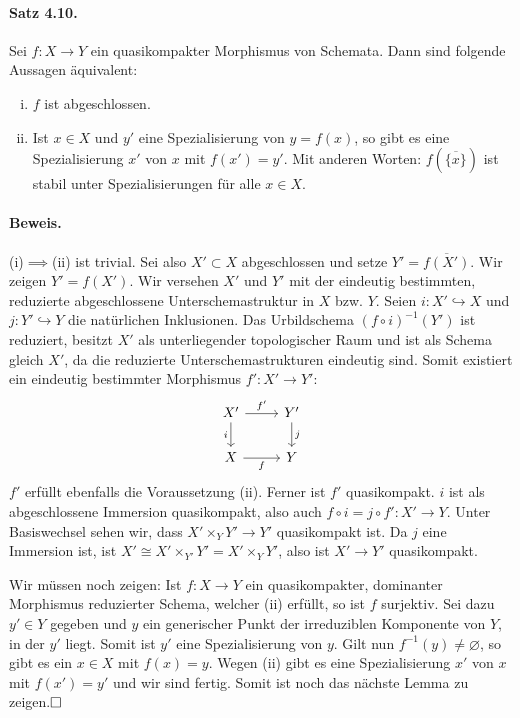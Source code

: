 \documentclass[11pt,b5paper,openany]{memoir}
\def \qed {$\hfill\square$}
\begin{document}
\paragraph{Satz 4.10.}\label{4.10} Sei $f:X\to Y$ ein quasikompakter Morphismus von Schemata. Dann sind folgende Aussagen äquivalent:
\begin{enumerate}[(i)]
\item $f$ ist abgeschlossen.
\item Ist $x\in X$ und $y'$ eine Spezialisierung von $y=f(x)$, so gibt es eine Spezialisierung $x'$ von $x$ mit $f(x')=y'$. Mit anderen Worten: $f(\overline{\{x\}})$ ist stabil unter Spezialisierungen für alle $x\in X$.
\end{enumerate}

\paragraph{Beweis.} (i)$\implies$(ii) ist trivial. Sei also $X'\subset X$ abgeschlossen und setze $Y'=\overline{f(X')}$. Wir zeigen $Y'=f(X')$. Wir versehen $X'$ und $Y'$ mit der eindeutig bestimmten, reduzierte abgeschlossene Unterschemastruktur in $X$ bzw. $Y$. Seien $i:X'\hookrightarrow X$ und $j:Y'\hookrightarrow Y$ die natürlichen Inklusionen. Das Urbildschema $(f\circ i)^{-1}(Y')$ ist reduziert, besitzt $X'$ als unterliegender topologischer Raum und ist als Schema gleich $X'$, da die reduzierte Unterschemastrukturen eindeutig sind. Somit existiert ein eindeutig bestimmter Morphismus $f':X'\to Y'$:
\[\begin{tikzcd}
X'\ar[r, "f'"]\ar[d, "i"'] & Y'\ar[d, "j"]\\
X\ar[r, "f"'] & Y
\end{tikzcd} \]
$f'$ erfüllt ebenfalls die Voraussetzung (ii). Ferner ist $f'$ quasikompakt. $i$ ist als abgeschlossene Immersion quasikompakt, also auch $f\circ i=j\circ f':X'\to Y$. Unter Basiswechsel sehen wir, dass $X'\times_YY'\to Y'$ quasikompakt ist. Da $j$ eine Immersion ist, ist $X'\cong X'\times_{Y'}Y' = X'\times_YY'$, also ist $X'\to Y'$ quasikompakt.

Wir müssen noch zeigen: Ist $f:X\to Y$ ein quasikompakter, dominanter Morphismus reduzierter Schema, welcher (ii) erfüllt, so ist $f$ surjektiv. Sei dazu $y'\in Y$ gegeben und $y$ ein generischer Punkt der irreduziblen Komponente von $Y$, in der $y'$ liegt. Somit ist $y'$ eine Spezialisierung von $y$. Gilt nun $f^{-1}(y)\neq\varnothing$, so gibt es ein $x\in X$ mit $f(x)=y$. Wegen (ii) gibt es eine Spezialisierung $x'$ von $x$ mit $f(x')=y'$ und wir sind fertig. Somit ist noch das nächste Lemma zu zeigen.\qed
\end{document}
